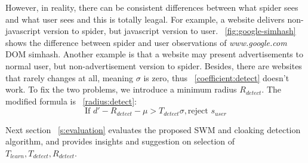 However, in reality, there can be consistent differences between what spider
sees and what user sees and this is totally leagal. For example, a website
delivers non-javascript version to spider, but javascript version to user.
~\autoref{fig:google-simhash} shows the difference between spider and user
observations of {\it www.google.com} DOM simhash. Another example is that a website may
present advertisements to normal user, but non-advertisement version to spider.
Besides, there are websites that rarely changes at all, meaning $\sigma$ is
zero, thus ~\autoref{coefficient:detect} doesn't work. To fix the two problems, we introduce
a minimum radius $R_{detect}$. The modified formula is ~\autoref{radius:detect}:
\begin{equation}
  \label{radius:detect}
  \text{If } d' - R_{detect} - \mu > T_{detect} \sigma, \text{reject } s_{user}
\end{equation}

Next section ~\autoref{s:evaluation} evaluates the proposed SWM and cloaking detection
algorithm, and provides insights and suggestion on selection of $T_{learn}, T_{detect},
R_{detect}$.



